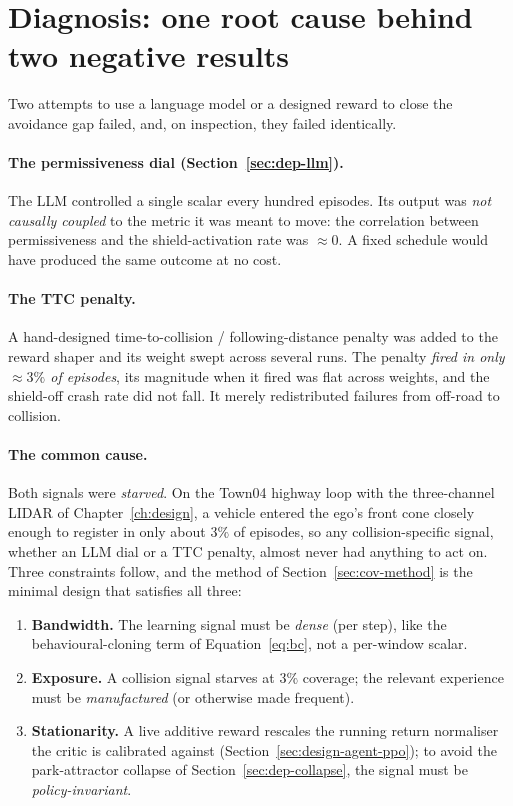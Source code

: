 \section{Diagnosis: one root cause behind two negative results}\label{sec:cov-diagnosis}

Two attempts to use a language model or a designed reward to close the avoidance gap failed, and,
on inspection, they failed identically.

\paragraph{The permissiveness dial (Section~\ref{sec:dep-llm}).} The LLM controlled a single scalar
every hundred episodes. Its output was \emph{not causally coupled} to the metric it was meant to
move: the correlation between permissiveness and the shield-activation rate was
\(\approx 0\). A fixed schedule would have produced the same outcome at no cost.

\paragraph{The TTC penalty.} A hand-designed time-to-collision / following-distance penalty was
added to the reward shaper and its weight swept across several runs. The penalty \emph{fired in only
\(\approx 3\%\) of episodes}, its magnitude when it fired was flat across weights, and the
shield-off crash rate did not fall. It merely redistributed failures from off-road to collision.

\paragraph{The common cause.} Both signals were \emph{starved}. On the Town04 highway loop with the
three-channel LIDAR of Chapter~\ref{ch:design}, a vehicle entered the ego's front cone closely
enough to register in only about \(3\%\) of episodes, so any collision-specific signal, whether
an LLM dial or a TTC penalty, almost never had anything to act on. Three constraints follow, and
the method of Section~\ref{sec:cov-method} is the minimal design that satisfies all three:
\begin{enumerate}
  \item \textbf{Bandwidth.} The learning signal must be \emph{dense} (per step), like the
        behavioural-cloning term of Equation~\eqref{eq:bc}, not a per-window scalar.
  \item \textbf{Exposure.} A collision signal starves at \(3\%\) coverage; the relevant experience
        must be \emph{manufactured} (or otherwise made frequent).
  \item \textbf{Stationarity.} A live additive reward rescales the running return normaliser the
        critic is calibrated against (Section~\ref{sec:design-agent-ppo}); to avoid the
        park-attractor collapse of Section~\ref{sec:dep-collapse}, the signal must be
        \emph{policy-invariant}.
\end{enumerate}

